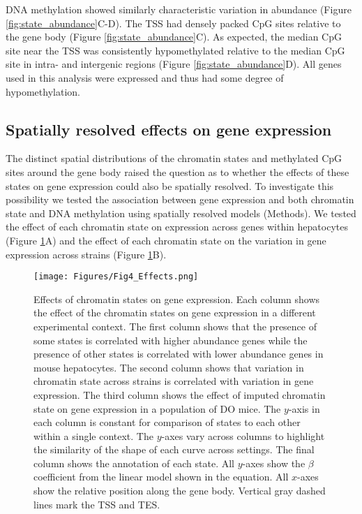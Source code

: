 \documentclass[
  11pt,
]{article}
\begin{document}
DNA methylation showed similarly characteristic variation in abundance
(Figure \ref{fig:state_abundance}C-D). The TSS had densely packed CpG
sites relative to the gene body (Figure \ref{fig:state_abundance}C). As
expected, the median CpG site near the TSS was consistently
hypomethylated relative to the median CpG site in intra- and intergenic
regions (Figure \ref{fig:state_abundance}D). All genes used in this
analysis were expressed and thus had some degree of hypomethylation.

\hypertarget{spatially-resolved-effects-on-gene-expression}{%
\subsection{Spatially resolved effects on gene
expression}\label{spatially-resolved-effects-on-gene-expression}}

The distinct spatial distributions of the chromatin states and
methylated CpG sites around the gene body raised the question as to
whether the effects of these states on gene expression could also be
spatially resolved. To investigate this possibility we tested the
association between gene expression and both chromatin state and DNA
methylation using spatially resolved models (Methods). We tested the
effect of each chromatin state on expression across genes within
hepatocytes (Figure \ref{fig:state_effects}A) and the effect of each
chromatin state on the variation in gene expression across strains
(Figure \ref{fig:state_effects}B).

\begin{figure}[ht!]
\texttt{[image: Figures/Fig4\_Effects.png]}
\caption{Effects of chromatin states on gene expression. Each column shows 
the effect of the chromatin states on gene expression in a different 
experimental context. The first column shows that the presence of some
states is correlated with higher abundance genes while the presence of
other states is correlated with lower abundance genes in mouse hepatocytes. 
The second column shows that variation in chromatin state across strains
is correlated with variation in gene expression. The third column 
shows the effect of imputed chromatin state on gene expression in a 
population of DO mice. The $y$-axis in each column is constant for comparison
of states to each other within a single context. The $y$-axes vary across
columns to highlight the similarity of the shape of each curve across 
settings. The final column shows the annotation of each state. All $y$-axes 
show the $\beta$ coefficient from the linear model shown in the equation. 
All $x$-axes show the relative position along the gene body. Vertical gray 
dashed lines mark the TSS and TES.}
\label{fig:state_effects}
\end{figure}
\end{document}

